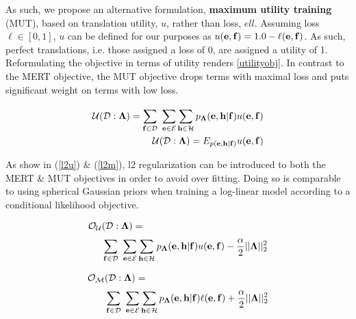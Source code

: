 \documentclass[11pt]{article}
\begin{document}
As such, we propose an alternative formulation, {\bf maximum utility training} (MUT), based on translation utility, $u$, rather than loss, $ell$. Assuming loss $\ell \in [0,1]$, $u$ can be defined for our purposes as $u({\bf e},{\bf f}) = 1.0 - \ell({\bf e}, {\bf f})$. As such, perfect translations, i.e. those assigned a loss of 0, are assigned a utility of 1. Reformulating the objective in terms of utility renders \ref{utilityobj}. In contrast to the MERT objective, the MUT objective drops terms with maximal loss and puts significant weight on terms with low loss.

\begin{equation}
\begin{split}
{\cal U}({\cal D} : {\bf \Lambda}) = \sum_{{\bf f} \in {\cal D}}^{}\ \sum_{{\bf e} \in {\cal E}} \sum_{{\bf h} \in {\cal H}} p_{\bf \Lambda} ({\bf e},  {\bf h} | {\bf f}) u({\bf e}, {\bf f}) \\
{\cal U}({\cal D} : {\bf \Lambda}) = E_{p({\bf e},{\bf h} | {\bf f})} u({\bf e}, {\bf f})
\end{split}
\label{utilityobj}
\end{equation}

As show in (\ref{l2u}) \& (\ref{l2m}), l2 regularization can be introduced to both the MERT \& MUT objectives in order to avoid over fitting. Doing so is comparable to using spherical Gaussian priors when training a log-linear model according to a conditional likelihood objective. 

\begin{equation}
\begin{split}
{\cal O}_{\cal U}&({\cal D} : {\bf \Lambda}) = \\&\sum_{{\bf f} \in {\cal D}}^{}\ \sum_{{\bf e} \in {\cal E}} \sum_{{\bf h} \in {\cal H}} p_{\bf \Lambda} ({\bf e},  {\bf h} | {\bf f}) u({\bf e}, {\bf f}) - \frac{\alpha}{2} ||{\bf \Lambda}||_2^2
\end{split}
\label{l2u}
\end{equation}

\begin{equation}
\begin{split}
{\cal O}_{\cal M}&({\cal D} : {\bf \Lambda}) = \\&\sum_{{\bf f} \in {\cal D}}^{}\ \sum_{{\bf e} \in {\cal E}} \sum_{{\bf h} \in {\cal H}} p_{\bf \Lambda} ({\bf e},  {\bf h} | {\bf f}) \ell({\bf e}, {\bf f}) + \frac{\alpha}{2} ||{\bf \Lambda}||_2^2
\end{split}
\label{l2m}
\end{equation}
\end{document}
